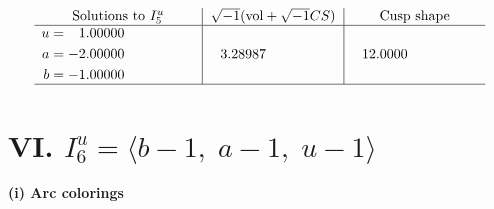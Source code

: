 \documentclass[1p]{elsarticle_modified}
\theoremstyle{definition}
\newcommand{\I}{\sqrt{-1}}
\begin{document}
$$\begin{array}{c|c|c}  
\text{Solutions to }I^u_{5}& \I (\text{vol} + \sqrt{-1}CS) & \text{Cusp shape}\\
 \hline 
\begin{aligned}
u &= \phantom{-}1.00000\phantom{ +0.000000I} \\
a &= -2.00000\phantom{ +0.000000I} \\
b &= -1.00000\phantom{ +0.000000I}\end{aligned}
 & \phantom{-}3.28987\phantom{ +0.000000I} & \phantom{-}12.0000\phantom{ +0.000000I}\\
 \hline 
 \end{array}$$\newpage\newpage\renewcommand{\arraystretch}{1}
\centering \section*{VI. $I^u_{6}= \langle b-1,\;a-1,\;u-1 \rangle$}
\flushleft \textbf{(i) Arc colorings}\\
\end{document}

